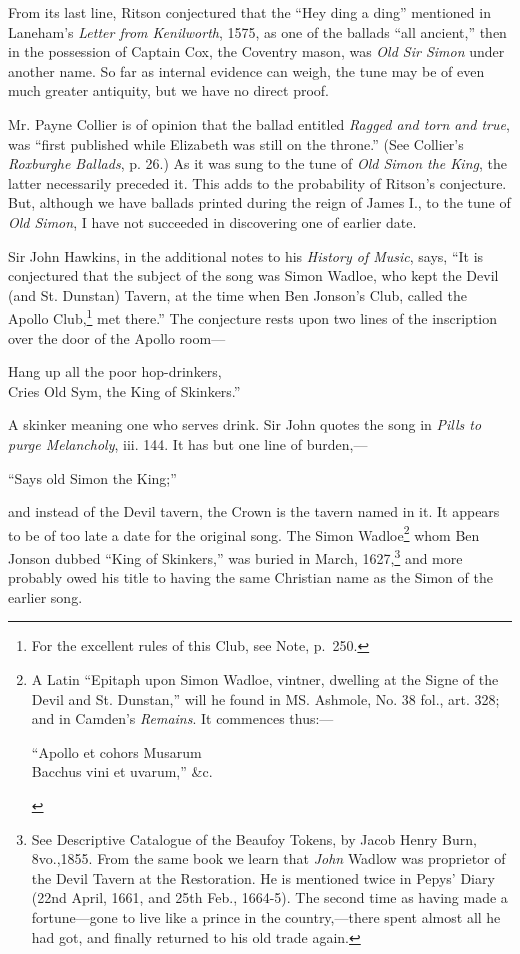 From its last line, Ritson conjectured that the “Hey ding a ding” mentioned
in Laneham’s \textit{Letter from Kenilworth}, 1575, as one of the ballads “all ancient,”
then in the possession of Captain Cox, the Coventry mason, was \textit{Old Sir Simon}
under another name. So far as internal evidence can weigh, the tune may be of
even much greater antiquity, but we have no direct proof.

Mr. Payne Collier is of opinion that the ballad entitled \textit{Ragged and torn and
true}, was “first published while Elizabeth was still on the throne.” (See Collier’s
\textit{Roxburghe Ballads}, p. 26.) As it was sung to the tune of \textit{Old Simon the King},
the latter necessarily preceded it. This adds to the probability of Ritson’s conjecture. 
But, although we have ballads printed during the reign of James I., to
the tune of \textit{Old Simon}, I have not succeeded in discovering one of earlier date.

Sir John Hawkins, in the additional notes to his \textit{History of Music}, says, “It is
conjectured that the subject of the song was Simon Wadloe, who kept the Devil
(and St. Dunstan) Tavern, at the time when Ben Jonson’s Club, called the
Apollo Club,\footnote{\textit{}
For the excellent rules of this Club, see Note, p.~250.}
 met there.” The conjecture rests upon two lines of the inscription
over the door of the Apollo room—
\settowidth{\versewidth}{Cries Old Sym, the King of Skinkers.”}
\begin{scverse}
Hang up all the poor hop-drinkers,\\
Cries Old Sym, the King of Skinkers.”
\end{scverse}
A skinker meaning one who serves drink. Sir John quotes the song in \textit{Pills to
purge Melancholy}, iii. 144. It has but one line of burden,—
\settowidth{\versewidth}{“Says old Simon the King; ”}
\begin{scverse}
“Says old Simon the King;”
\end{scverse}
and instead of the Devil tavern, the Crown is the tavern named in it. It appears
to be of too late a date for the original song. The Simon Wadloe\footnote{\textit{}
A Latin “Epitaph upon Simon Wadloe, vintner,
dwelling at the Signe of the Devil and St. Dunstan,” will
he found in MS. Ashmole, No. 38 fol., art. 328; and in
Camden’s \textit{Remains}. It commences thus:—
\settowidth{\versewidth}{“Apollo et cohors Musarum}
\begin{fnverse}
“Apollo et cohors Musarum\\
Bacchus vini et uvarum,” \&c.
\end{fnverse}}
 whom Ben
Jonson dubbed “King of Skinkers,” was buried in March, 1627,\footnote{\textit{}
See Descriptive Catalogue of the Beaufoy Tokens, by
Jacob Henry Burn, 8vo.,1855. From the same book we learn
that \textit{John} Wadlow was proprietor of the Devil Tavern at
the Restoration. He is mentioned twice in Pepys’ Diary
(22nd April, 1661, and 25th Feb., 1664-5). The second
time as having made a fortune—gone to live like a prince
in the country,—there spent almost all he had got, and
finally returned to his old trade again.}
 and more
probably owed his title to having the same Christian name as the Simon of the
earlier song.


